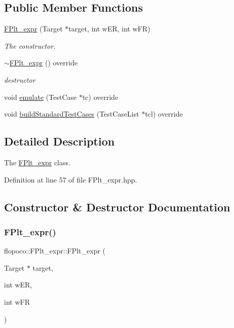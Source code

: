 \subsection*{Public Member Functions}
\begin{DoxyCompactItemize}
\item 
\hyperlink{classflopoco_1_1FPlt__expr_a19acd45f1b76382aee8fe97e53a0b96b}{F\+Plt\+\_\+expr} (Target $\ast$target, int w\+ER, int w\+FR)
\begin{DoxyCompactList}\small\item\em The constructor. \end{DoxyCompactList}\item 
\hyperlink{classflopoco_1_1FPlt__expr_a7ee67e3677aa8fede60ea214e38d0139}{$\sim$\+F\+Plt\+\_\+expr} () override
\begin{DoxyCompactList}\small\item\em destructor \end{DoxyCompactList}\item 
void \hyperlink{classflopoco_1_1FPlt__expr_afd9b4ffd16552084979ada3a06c0488e}{emulate} (Test\+Case $\ast$tc) override
\item 
void \hyperlink{classflopoco_1_1FPlt__expr_a523f7687ad0f6477a33cb01825ef3c3a}{build\+Standard\+Test\+Cases} (Test\+Case\+List $\ast$tcl) override
\end{DoxyCompactItemize}


\subsection{Detailed Description}
The \hyperlink{classflopoco_1_1FPlt__expr}{F\+Plt\+\_\+expr} class. 

Definition at line 57 of file F\+Plt\+\_\+expr.\+hpp.



\subsection{Constructor \& Destructor Documentation}
\mbox{\label{classflopoco_1_1FPlt__expr_a19acd45f1b76382aee8fe97e53a0b96b}} 
\subsubsection{\texorpdfstring{F\+Plt\+\_\+expr()}{FPlt\_expr()}}
{\footnotesize\ttfamily flopoco\+::\+F\+Plt\+\_\+expr\+::\+F\+Plt\+\_\+expr (\begin{DoxyParamCaption}\item[{Target $\ast$}]{target,  }\item[{int}]{w\+ER,  }\item[{int}]{w\+FR }\end{DoxyParamCaption})}



